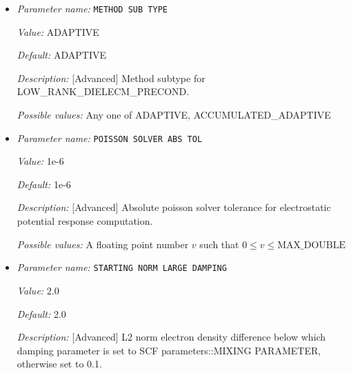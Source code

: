 \begin{itemize}
{\it Description:} [Advanced] Estimate condition number of the Jacobian at the final SCF iteration step using a low rank approximation with ADAPTIVE RANK REL TOL=1.0e-5.


{\it Possible values:} A boolean value (true or false)
\item {\it Parameter name:} {\tt METHOD SUB TYPE}
\label{parameters:SCF parameters/LOW RANK DIELECM PRECOND/METHOD SUB TYPE}
\label{parameters:SCF_20parameters/LOW_20RANK_20DIELECM_20PRECOND/METHOD_20SUB_20TYPE}


{\it Value:} ADAPTIVE


{\it Default:} ADAPTIVE


{\it Description:} [Advanced] Method subtype for LOW\_RANK\_DIELECM\_PRECOND.


{\it Possible values:} Any one of ADAPTIVE, ACCUMULATED\_ADAPTIVE
\item {\it Parameter name:} {\tt POISSON SOLVER ABS TOL}
\label{parameters:SCF parameters/LOW RANK DIELECM PRECOND/POISSON SOLVER ABS TOL}
\label{parameters:SCF_20parameters/LOW_20RANK_20DIELECM_20PRECOND/POISSON_20SOLVER_20ABS_20TOL}


{\it Value:} 1e-6


{\it Default:} 1e-6


{\it Description:} [Advanced] Absolute poisson solver tolerance for electrostatic potential response computation.


{\it Possible values:} A floating point number $v$ such that $0 \leq v \leq \text{MAX\_DOUBLE}$
\item {\it Parameter name:} {\tt STARTING NORM LARGE DAMPING}
\label{parameters:SCF parameters/LOW RANK DIELECM PRECOND/STARTING NORM LARGE DAMPING}
\label{parameters:SCF_20parameters/LOW_20RANK_20DIELECM_20PRECOND/STARTING_20NORM_20LARGE_20DAMPING}


{\it Value:} 2.0


{\it Default:} 2.0


{\it Description:} [Advanced] L2 norm electron density difference below which damping parameter is set to SCF parameters::MIXING PARAMETER, otherwise set to 0.1.



\end{itemize}
